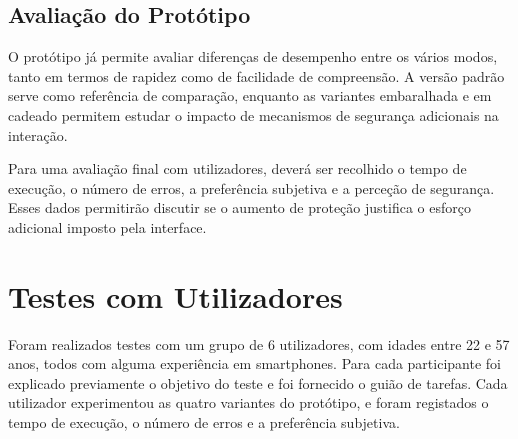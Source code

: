 \documentclass[a4paper]{article}
\begin{document}
\subsection{Avaliação do Protótipo}
O protótipo já permite avaliar diferenças de desempenho entre os vários modos, tanto em termos de rapidez como de facilidade de compreensão. A 
versão padrão serve como referência de comparação, enquanto as variantes embaralhada e em cadeado permitem estudar o impacto de mecanismos de 
segurança adicionais na interação.

Para uma avaliação final com utilizadores, deverá ser recolhido o tempo de execução, o número de erros, a preferência subjetiva e a perceção de 
segurança. Esses dados permitirão discutir se o aumento de proteção justifica o esforço adicional imposto pela interface.

\newpage
\section{Testes com Utilizadores}
Foram realizados testes com um grupo de 6 utilizadores, com idades entre 22 e 57 anos, todos com alguma experiência em smartphones. Para 
cada participante foi explicado previamente o objetivo do teste e foi fornecido o guião de tarefas. 
Cada utilizador experimentou as quatro variantes do protótipo, e foram registados o tempo de execução, o número de erros e a preferência subjetiva.
\end{document}
